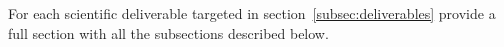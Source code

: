 {\color{gray}
For each scientific deliverable targeted in
section~\ref{subsec:deliverables} provide a full section with all the
subsections described below.
}
